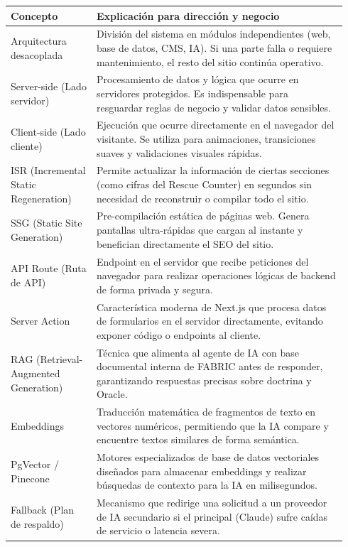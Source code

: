 \documentclass[11pt,letterpaper]{article}
\begin{document}
\begin{longtable}{p{0.24\linewidth}p{0.70\linewidth}}
\toprule
\textbf{Concepto} & \textbf{Explicación para dirección y negocio} \\
\midrule
Arquitectura desacoplada & División del sistema en módulos independientes (web, base de datos, CMS, IA). Si una parte falla o requiere mantenimiento, el resto del sitio continúa operativo. \\
Server-side (Lado servidor) & Procesamiento de datos y lógica que ocurre en servidores protegidos. Es indispensable para resguardar reglas de negocio y validar datos sensibles. \\
Client-side (Lado cliente) & Ejecución que ocurre directamente en el navegador del visitante. Se utiliza para animaciones, transiciones suaves y validaciones visuales rápidas. \\
ISR (Incremental Static Regeneration) & Permite actualizar la información de ciertas secciones (como cifras del Rescue Counter) en segundos sin necesidad de reconstruir o compilar todo el sitio. \\
SSG (Static Site Generation) & Pre-compilación estática de páginas web. Genera pantallas ultra-rápidas que cargan al instante y benefician directamente el SEO del sitio. \\
API Route (Ruta de API) & Endpoint en el servidor que recibe peticiones del navegador para realizar operaciones lógicas de backend de forma privada y segura. \\
Server Action & Característica moderna de Next.js que procesa datos de formularios en el servidor directamente, evitando exponer código o endpoints al cliente. \\
RAG (Retrieval-Augmented Generation) & Técnica que alimenta al agente de IA con base documental interna de FABRIC antes de responder, garantizando respuestas precisas sobre doctrina y Oracle. \\
Embeddings & Traducción matemática de fragmentos de texto en vectores numéricos, permitiendo que la IA compare y encuentre textos similares de forma semántica. \\
PgVector / Pinecone & Motores especializados de base de datos vectoriales diseñados para almacenar embeddings y realizar búsquedas de contexto para la IA en milisegundos. \\
Fallback (Plan de respaldo) & Mecanismo que redirige una solicitud a un proveedor de IA secundario si el principal (Claude) sufre caídas de servicio o latencia severa. \\

\end{longtable}
\end{document}
